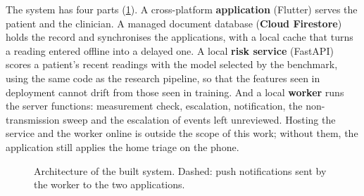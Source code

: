 The system has four parts (\cref{fig:architecture}). A cross-platform \textbf{application} (Flutter) serves the patient and the clinician. A managed document database (\textbf{Cloud Firestore}) holds the record and synchronises the applications, with a local cache that turns a reading entered offline into a delayed one. A local \textbf{risk service} (FastAPI) scores a patient's recent readings with the model selected by the benchmark, using the same code as the research pipeline, so that the features seen in deployment cannot drift from those seen in training. And a local \textbf{worker} runs the server functions: measurement check, escalation, notification, the non-transmission sweep and the escalation of events left unreviewed. Hosting the service and the worker online is outside the scope of this work; without them, the application still applies the home triage on the phone.

\begin{figure}[htbp]
\centering
{}
\caption{Architecture of the built system. Dashed: push notifications sent by the worker to the two applications.}\label{fig:architecture}
\end{figure}

